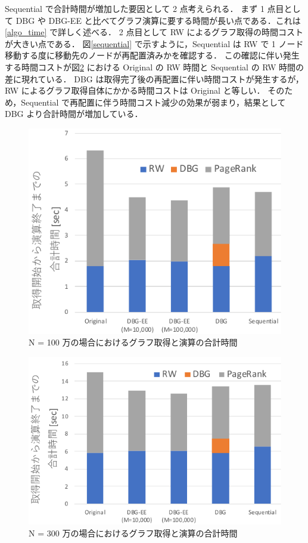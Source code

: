 Sequential で合計時間が増加した要因として 2 点考えられる．
まず 1 点目として DBG や DBG-EE と比べてグラフ演算に要する時間が長い点である．これは\ref{algo_time} で詳しく述べる．
2 点目として RW によるグラフ取得の時間コストが大きい点である．
図\ref{sequential} で示すように，Sequential は RW で 1 ノード移動する度に移動先のノードが再配置済みかを確認する．
この確認に伴い発生する時間コストが図\ref{total_time_3000000} における Original の RW 時間と Sequential の RW 時間の差に現れている．
DBG は取得完了後の再配置に伴い時間コストが発生するが，RW によるグラフ取得自体にかかる時間コストは Original と等しい．
そのため，Sequential で再配置に伴う時間コスト減少の効果が弱まり，結果として DBG より合計時間が増加している．
\begin{figure}[t]
  \centering
  \includegraphics[width=0.8\linewidth]{./figure/total_time_1000000.pdf}
  \caption{N = 100 万の場合におけるグラフ取得と演算の合計時間}
  \label{total_time_1000000}
\end{figure}
\begin{figure}[t]
  \centering
  \includegraphics[width=0.8\linewidth]{./figure/total_time_3000000.pdf}
  \caption{N = 300 万の場合におけるグラフ取得と演算の合計時間}
  \label{total_time_3000000}
\end{figure}

